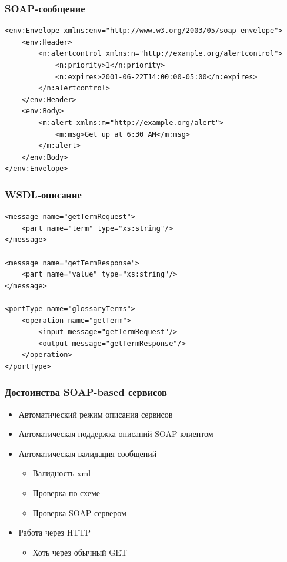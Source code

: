 \documentclass{../../slides-style}
\begin{document}
    \begin{frame}[fragile]
        \frametitle{SOAP-сообщение}
        \begin{small}
            \begin{verbatim}
<env:Envelope xmlns:env="http://www.w3.org/2003/05/soap-envelope">
    <env:Header>
        <n:alertcontrol xmlns:n="http://example.org/alertcontrol">
            <n:priority>1</n:priority>
            <n:expires>2001-06-22T14:00:00-05:00</n:expires>
        </n:alertcontrol>
    </env:Header>
    <env:Body>
        <m:alert xmlns:m="http://example.org/alert">
            <m:msg>Get up at 6:30 AM</m:msg>
        </m:alert>
    </env:Body>
</env:Envelope>
            \end{verbatim}
        \end{small}
    \end{frame}

    \begin{frame}[fragile]
        \frametitle{WSDL-описание}
        \begin{small}
            \begin{verbatim}
<message name="getTermRequest">
    <part name="term" type="xs:string"/>
</message>

<message name="getTermResponse">
    <part name="value" type="xs:string"/>
</message>

<portType name="glossaryTerms">
    <operation name="getTerm">
        <input message="getTermRequest"/>
        <output message="getTermResponse"/>
    </operation>
</portType>
            \end{verbatim}
        \end{small}
    \end{frame}

    \begin{frame}
        \frametitle{Достоинства SOAP-based сервисов}
        \begin{itemize}
            \item Автоматический режим описания сервисов
            \item Автоматическая поддержка описаний SOAP-клиентом
            \item Автоматическая валидация сообщений
            \begin{itemize}
                \item Валидность xml
                \item Проверка по схеме
                \item Проверка SOAP-сервером
            \end{itemize}
            \item Работа через HTTP
            \begin{itemize}
                \item Хоть через обычный GET
            \end{itemize}
        \end{itemize}
    \end{frame}
\end{document}
